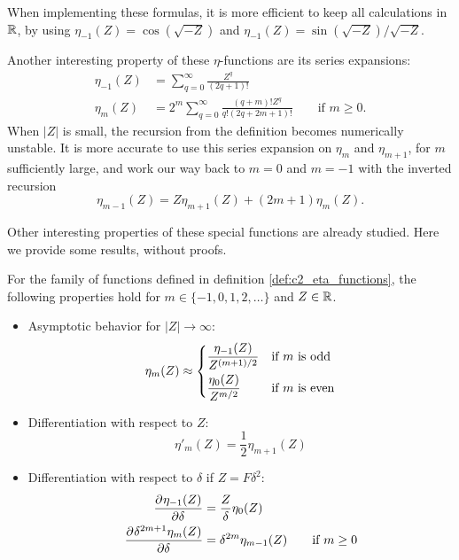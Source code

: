 When implementing these formulas, it is more efficient to keep all calculations in $\mathbb{R}$, by using $\eta_{-1}(Z) = \cos(\sqrt{-Z})$ and $\eta_{-1}(Z) = \sin(\sqrt{-Z})/\sqrt{-Z}$.

Another interesting property of these $\eta$-functions are its series expansions:\begin{align*}
    \eta_{-1}(Z) & = \sum_{q=0}^{\infty} \frac{Z^q}{(2q + 1)!}                                                      \\
    \eta_{m}(Z)  & = 2^m \sum_{q=0}^{\infty} \frac{(q+m)! Z^q}{q!(2q + 2m + 1)!} \qquad \text{if } m \geq 0\text{.}
\end{align*}
When $|Z|$ is small, the recursion from the definition becomes numerically unstable. It is more accurate to use this series expansion on $\eta_m$ and $\eta_{m+1}$, for $m$ sufficiently large, and work our way back to $m=0$ and $m=-1$ with the inverted recursion
$$
    \eta_{m-1}(Z) = Z \eta_{m+1}(Z) + (2 m + 1) \eta_{m}(Z)
    \text{.}
$$

Other interesting properties of these special functions are already studied. Here we provide some results, without proofs.
\begin{theorem}[Ixaru 1984]\label{the:c2_eta_functions}
    For the family of functions defined in definition \ref{def:c2_eta_functions}, the following properties hold for $m \in \{-1, 0, 1, 2, \dots\}$ and $Z \in \mathbb{R}$.
    \begin{itemize}
        \item Asymptotic behavior for $|Z| \to \infty$:
              $$\eta_m(Z) \approx  \begin{dcases}
                      \frac{\eta_{-1}(Z)}{Z^{(m+1)/2}} & \text{if $m$ is odd}  \\
                      \frac{\eta_{0}(Z)}{Z^{m/2}}      & \text{if $m$ is even}
                  \end{dcases}$$
        \item Differentiation with respect to $Z$:
              $$
                  \eta'_{m}(Z) = \frac{1}{2}\eta_{m+1}(Z)
              $$
        \item Differentiation with respect to $\delta$ if $Z = F\delta^2$:
              \begin{align*}
                  \pdv[]{\eta_{-1}(Z)}{\delta}             & = \frac{Z}{\delta} \eta_0(Z)                           \\
                  \pdv[]{\delta^{2m+1}\eta_{m}(Z)}{\delta} & = \delta^{2m} \eta_{m-1}(Z) \qquad \text{if } m \geq 0 \\
              \end{align*}
    \end{itemize}
\end{theorem}

